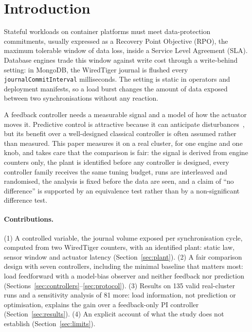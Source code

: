 \documentclass[smallextended]{svjour3}
\begin{document}
\section{Introduction}\label{sec:intro}
Stateful workloads on container platforms must meet data-protection
commitments, usually expressed as a Recovery Point Objective (RPO), the
maximum tolerable window of data loss, inside a Service Level Agreement (SLA).
Database engines trade this window against write cost through a write-behind
setting: in MongoDB, the WiredTiger journal is flushed every
\texttt{journalCommitInterval} milliseconds. The setting is static in
operators and deployment manifests, so a load burst changes the amount of data
exposed between two synchronisations without any reaction.

A feedback controller needs a measurable signal and a model of how the
actuator moves it. Predictive control is attractive because it can
anticipate disturbances~\cite{camacho2013model}, but its benefit over a
well-designed classical controller is often assumed rather than measured. This
paper measures it on a real cluster, for one engine and one knob, and takes care
that the comparison is fair: the signal is derived from engine counters only,
the plant is identified before any controller is designed, every controller
family receives the same tuning budget, runs are interleaved and randomised, the
analysis is fixed before the data are seen, and a claim of ``no difference'' is
supported by an equivalence test rather than by a non-significant difference test.

\paragraph{Contributions.}
(1) A controlled variable, the journal volume exposed per synchronisation cycle,
computed from two WiredTiger counters, with an identified plant: static law,
sensor window and actuator latency (Section~\ref{sec:plant}).
(2) A fair comparison design with seven controllers, including the minimal
baseline that matters most: load feedforward with a model-bias observer and neither
feedback nor prediction (Sections~\ref{sec:controllers}--\ref{sec:protocol}).
(3) Results on 135 valid real-cluster runs and a sensitivity analysis of 81 more: load information, not prediction or
optimisation, explains the gain over a feedback-only PI controller
(Section~\ref{sec:results}).
(4) An explicit account of what the study does not establish
(Section~\ref{sec:limits}).
\end{document}
